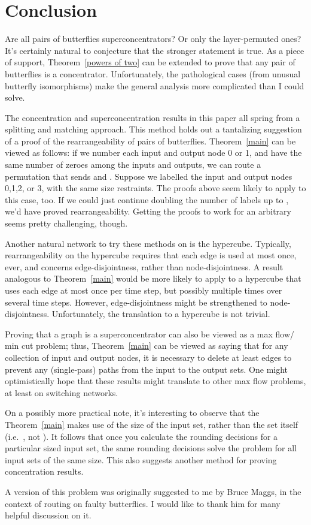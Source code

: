 \documentclass[12pt]{article}
\begin{document}
\section{Conclusion}
Are all pairs of butterflies superconcentrators?  Or only the layer-permuted
ones?  It's certainly natural to conjecture that the stronger statement is
true.  As a piece of support, Theorem~\ref{powers of two} can be extended
to prove that any pair of butterflies is a  concentrator.
Unfortunately, the pathological cases (from unusual butterfly isomorphisms)
make the general analysis more complicated than I could solve.

The concentration and superconcentration 
results in this paper all spring from a splitting
and matching approach.
This method holds out a tantalizing suggestion of a
proof of the rearrangeability of pairs of butterflies.
Theorem~\ref{main} can be viewed as follows: if we number each
input and output node 0 or 1, and have the same number of 
zeroes among the inputs and outputs, we can route a permutation
that sends  and .  
Suppose we labelled the input and output nodes
0,1,2, or 3, with the same size restraints.  The proofs above seem
likely to apply to this case, too.  If we could just continue
doubling the number of labels up to , we'd have proved
rearrangeability.  Getting the proofs to work for an arbitrary
 seems pretty challenging, though.

Another natural network to try these methods on is the hypercube.
Typically, rearrangeability on the hypercube requires that each
edge is used at most once, ever, and concerns edge-disjointness, rather
than node-disjointness.  A result analogous to 
Theorem~\ref{main} would be more likely to apply to a hypercube
that uses each edge at most once per time step, but possibly multiple
times over several time steps.  However, edge-disjointness might
be strengthened to node-disjointness.  Unfortunately, the translation
to a hypercube is not trivial.

Proving that a graph is a superconcentrator can also be viewed as a
max flow/ min cut problem; thus, Theorem~\ref{main} can be viewed as 
saying that
for any collection of  input and  output nodes, it is 
necessary to delete at least  edges to prevent any (single-pass)
paths from the input to the output sets.  One might optimistically hope
that these results might translate to other max flow problems, at least
on switching networks.

On a possibly more practical note, it's interesting to observe that the
Theorem~\ref{main} makes use of the size of the 
input set, rather than the set itself (i.e.\ , not ).  It follows that
once you calculate the rounding decisions for a particular sized
input set, the same rounding decisions solve the problem for all
input sets of the same size.  This also suggests another method for
proving concentration results.

A version of this problem was originally suggested to me by Bruce Maggs, 
in the 
context of routing on faulty butterflies.  I would like to thank him for
many helpful discussion on it.



\end{document}
